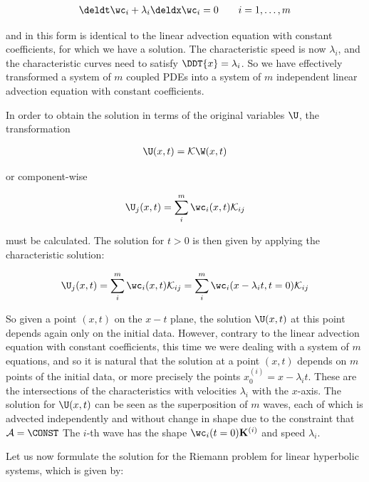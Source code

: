 \begin{align}
    \deldt \wc_i + \lambda_i \deldx \wc_i = 0 \quad \quad i = 1, \dots, m
\end{align}

and in this form is identical to the linear advection equation with constant coefficients, for
which we have a solution. The characteristic speed is now $\lambda_i$, and the characteristic curves
need to satisfy $\DDT{x} = \lambda_i$. So we have effectively transformed a system of $m$ coupled
PDEs into a system of $m$ independent linear advection equation with constant coefficients.

In order to obtain the solution in terms of the original variables $\U$, the transformation

\begin{align}
    \U(x,t) = \mathcal{K} \W(x,t)
\end{align}

or component-wise

\begin{align}
    \U_j(x,t) = \sum_i^m \wc_i(x,t) \mathcal{K}_{ij}
\end{align}

must be calculated. The solution for $t > 0$ is then given by applying the characteristic solution:


\begin{align}
    \U_j(x,t) = \sum_i^m \wc_i(x,t) \mathcal{K}_{ij} = \sum_i^m \wc_i(x - \lambda_i t,t=0)
\mathcal{K}_{ij}
\end{align}

So given a point $(x, t)$ on the $x-t$ plane, the solution $\U(x,t)$ at this point depends again
only on the initial data. However, contrary to the linear advection equation with constant
coefficients, this time we were dealing with a system of $m$ equations, and so it is natural that
the solution at a point $(x, t)$ depends on $m$ points of the initial data, or more precisely the
points $x_0^{(i)} = x - \lambda_i t$. These are the intersections of the characteristics with
velocities $\lambda_i$ with the $x$-axis. The solution for $\U(x,t)$ can be seen as the
superposition of $m$ waves, each of which is advected independently and without change in shape due
to the constraint that $\mathcal{A} = \CONST$
The $i$-th wave has the shape $\wc_i(t=0)
\mathbf{K}^{(i)}$ and speed $\lambda_i$.

Let us now formulate the solution for the Riemann problem for linear hyperbolic systems, which is
given by:

